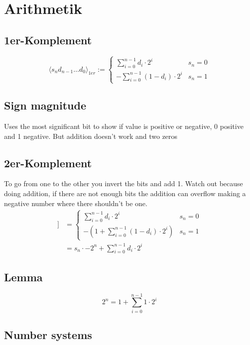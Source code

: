 \newpage
\section{Arithmetik}
	
	\begin{multicols}{2}
		\subsection{1er-Komplement}
			\[
				\langle s_nd_{n-1} \ldots d_0 \rangle_{1er} := \begin{cases}
				\sum\limits_{i=0}^{n-1} d_i \cdot 2^i          &  s_n = 0\\
				-\sum\limits_{i=0}^{n-1} (1-d_i) \cdot 2^i     & s_n = 1 
				\end{cases}
			\]
			
		\subsection{Sign magnitude}
		Uses the most significant bit to show if value is positive or negative, 0 positive and 1 negative. But addition doesn't work and two zeros
		
		\subsection{2er-Komplement}
		To go from one to the other you invert the bits and add 1. Watch out because doing addition, if there are not enough bits the addition can overflow making a negative number where there shouldn't be one.
			\begin{align*}
				[\![ s_nd_{n-1} \ldots d_0 ]\!] &= \begin{cases}
				\sum\limits_{i=0}^{n-1} d_i \cdot 2^i          &  s_n = 0\\
				-(1 + \sum\limits_{i=0}^{n-1} (1-d_i) \cdot 2^i)     & s_n = 1 
				\end{cases} \\
				& =  s_n \cdot -2^n + \sum \limits_{i=0}^{n-1} d_i \cdot 2^i
			\end{align*}

		\subsection{Lemma}
			\[ 2^n = 1 + \sum\limits_{i=0}^{n-1} 1 \cdot 2^i \]
	\end{multicols}
	\subsection{Number systems}
